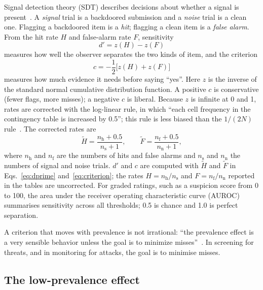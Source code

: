 \documentclass[11pt]{article}
\begin{document}
Signal detection theory (SDT) describes decisions about whether a signal is present~\cite{green1966,hautus2021}. A \emph{signal} trial is a backdoored submission and a \emph{noise} trial is a clean one. Flagging a backdoored item is a \emph{hit}; flagging a clean item is a \emph{false alarm}. From the hit rate $H$ and false-alarm rate $F$, sensitivity
\begin{equation}\label{eq:dprime}
d' = z(H) - z(F)
\end{equation}
measures how well the observer separates the two kinds of item, and the criterion
\begin{equation}\label{eq:criterion}
c = -\frac{1}{2}\bigl[z(H) + z(F)\bigr]
\end{equation}
measures how much evidence it needs before saying ``yes''. Here $z$ is the inverse of the standard normal cumulative distribution function. A positive $c$ is conservative (fewer flags, more misses); a negative $c$ is liberal. Because $z$ is infinite at 0 and 1, rates are corrected with the log-linear rule, in which ``each cell frequency in the contingency table is increased by 0.5''; this rule is less biased than the $1/(2N)$ rule~\cite[Abstract]{hautus1995}. The corrected rates are
\begin{equation}\label{eq:loglinear}
\tilde H = \frac{n_{\mathrm{h}} + 0.5}{n_{\mathrm{s}} + 1}, \qquad \tilde F = \frac{n_{\mathrm{f}} + 0.5}{n_{\mathrm{n}} + 1},
\end{equation}
where $n_{\mathrm{h}}$ and $n_{\mathrm{f}}$ are the numbers of hits and false alarms and $n_{\mathrm{s}}$ and $n_{\mathrm{n}}$ the numbers of signal and noise trials. $d'$ and $c$ are computed with $\tilde H$ and $\tilde F$ in Eqs.~\eqref{eq:dprime} and~\eqref{eq:criterion}; the rates $H = n_{\mathrm{h}}/n_{\mathrm{s}}$ and $F = n_{\mathrm{f}}/n_{\mathrm{n}}$ reported in the tables are uncorrected. For graded ratings, such as a suspicion score from 0 to 100, the area under the receiver operating characteristic curve (AUROC) summarises sensitivity across all thresholds; 0.5 is chance and 1.0 is perfect separation.

A criterion that moves with prevalence is not irrational: ``the prevalence effect is a very sensible behavior unless the goal is to minimize misses''~\cite[Introduction]{wolfe2007}. In screening for threats, and in monitoring for attacks, the goal is to minimise misses.

\subsection{The low-prevalence effect}\label{sec:lpe}
\end{document}
